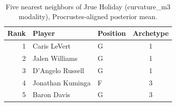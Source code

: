 \begin{table}[htbp]
  \centering\small
  \begin{tabular}{rllc}
    \toprule
    Rank & Player & Position & Archetype \\
    \midrule
    1 & Caris LeVert & G & 1 \\
    2 & Jalen Williams & G & 1 \\
    3 & D'Angelo Russell & G & 1 \\
    4 & Jonathan Kuminga & F & 3 \\
    5 & Baron Davis & G & 3 \\
    \bottomrule
  \end{tabular}
  \caption{Five nearest neighbors of Jrue Holiday (curvature_m3 modality), Procrustes-aligned posterior mean.}
  \label{tab:Jrue_Holiday_neighbors_curvature_m3}
\end{table}

